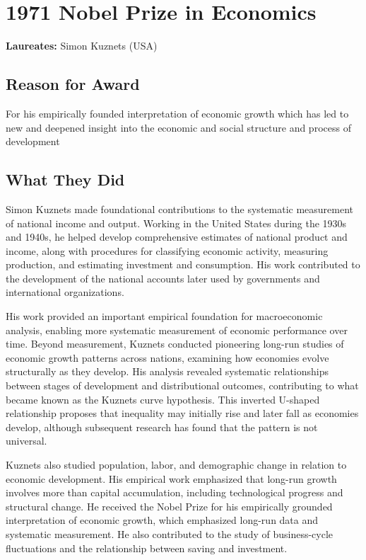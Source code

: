 \chapter{1971 Nobel Prize in Economics}
\textbf{Laureates: }Simon Kuznets (USA)

\section*{Reason for Award}
For his empirically founded interpretation of economic growth which has led to new and deepened
insight into the economic and social structure and process of development

\section{What They Did}
Simon Kuznets made foundational contributions to the systematic measurement of national income
and output. Working in the United States during the 1930s and 1940s, he helped develop comprehensive
estimates of national product and income, along with procedures for classifying economic activity,
measuring production, and estimating investment and consumption. His work contributed to the
development of the national accounts later used by governments and international organizations.

His work provided an important empirical foundation for macroeconomic analysis, enabling more
systematic measurement of economic performance over time. Beyond measurement, Kuznets conducted
pioneering long-run studies of economic growth patterns across nations, examining how economies
evolve structurally as they develop. His analysis revealed systematic relationships between
stages of development and distributional outcomes, contributing to what became known as the
Kuznets curve hypothesis. This inverted U-shaped relationship proposes that inequality may initially
rise and later fall as economies develop, although subsequent research has found that the pattern
is not universal.

Kuznets also studied population, labor, and demographic change in relation to economic development.
His empirical work emphasized that long-run growth involves more than capital accumulation,
including technological progress and structural change. He received the Nobel Prize for his
empirically grounded interpretation of economic growth, which emphasized long-run data and
systematic measurement. He also contributed to the study of business-cycle fluctuations and the
relationship between saving and investment.

